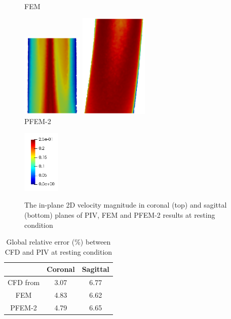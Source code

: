 \begin{figure}
\begin{minipage}[c][10cm][c]{0.25\textwidth}
\\FEM
\end{minipage}
\begin{minipage}[c][10cm][c]{0.25\textwidth}
\centering
\vspace*{\fill}
\includegraphics[height=4cm]{imgs/vena_cava/PFEM_coronal_exercise.png}
\includegraphics[height=5cm]{imgs/vena_cava/PFEM_sagittal_exercise.png}
\\PFEM-2
\end{minipage}
\begin{minipage}[c][10cm][t]{0.1\textwidth}
\vspace*{\fill}
\centering
\includegraphics[height=3cm]{imgs/vena_cava/colormap_exercise.png}
\\
\end{minipage}
\caption{The in-plane 2D velocity magnitude in coronal (top) and sagittal (bottom) planes of PIV, FEM and PFEM-2 results at resting condition}
\label{fig:process1}
\end{figure}

\begin{table}[h!]
\caption {Global relative error (\%) between CFD and PIV at resting condition} \label{tab:convergence}
\centering
\begin{tabular}{|c|c|c|}
\hline
       & Coronal & Sagittal \\ \hline
CFD from \cite{craven_cfd}  & 3.07    & 6.77     \\ \hline
FEM    & 4.83    & 6.62     \\ \hline
PFEM-2 & 4.79    & 6.65     \\ \hline
\end{tabular}
\end{table}

